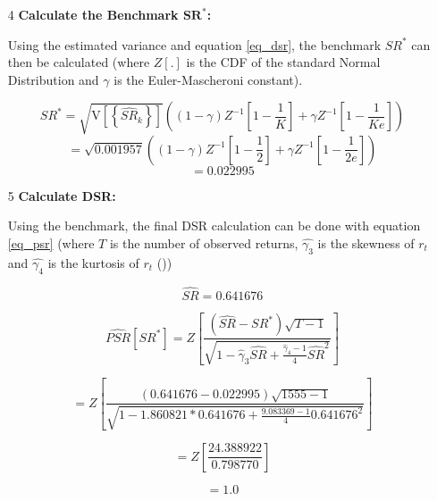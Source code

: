 \documentclass[a4paper,11pt,oneside]{article}
\theoremstyle{plain}
\theoremstyle{definition}
\begin{document}
\begin{itemize}
		\item [4] \textbf{Calculate the Benchmark $\mathbf{SR^*}$:} \newline
		
		Using the estimated variance and equation \eqref{eq_dsr}, the benchmark $SR^*$ can then be calculated (where $Z[.]$ is the CDF of the standard Normal Distribution 
		and $\gamma$ is the Euler-Mascheroni constant).
		
		\begin{equation}
		S R^{*}=\sqrt{\mathrm{V}\left[\left\{\widehat{S R}_{k}\right\}\right]}\left((1-\gamma) Z^{-1}\left[1-\frac{1}{K}\right]+\gamma Z^{-1}\left[1-\frac{1}{K e}\right]\right)
		\end{equation}
		\begin{equation}
		=\sqrt{{0.001957}}\left((1-\gamma) Z^{-1}\left[1-\frac{1}{2}\right]+\gamma Z^{-1}\left[1-\frac{1}{2 e}\right]\right)
		\end{equation}
		\begin{equation}
		=0.022995
		\end{equation}
		
		\item [5] \textbf{Calculate DSR:} \newline
		
		Using the benchmark, the final DSR calculation can be done with equation \eqref{eq_psr} (where $T$ is the number of observed returns, $\hat{\gamma_3}$ is the skewness of $r_t$ and $\hat{\gamma_4}$ is the kurtosis of $r_t$	())
		
		\begin{equation}
		\widehat{SR}=0.641676
		\end{equation}
		
		\begin{equation}
		\widehat{P S R}\left[S R^{*}\right]=Z\left[\frac{\left(\widehat{S R}-S R^{*}\right) \sqrt{T-1}}{\sqrt{1-\hat{\gamma}_{3} \widehat{S R}+\frac{\hat{\gamma}_{4}-1}{4} \widehat{S R}^{2}}}\right]
		\end{equation}
		
		\begin{equation}
		=Z\left[\frac{\left({0.641676}-{0.022995}\right) \sqrt{1555-1}}{\sqrt{1-{1.860821}\ast{0.641676}+\frac{{9.083369}-1}{4}{0.641676}^{2}}}\right]
		\end{equation}
		
		\begin{equation}
		=Z\left[\frac{24.388922}{0.798770}\right]
		\end{equation}
		
		\begin{equation}
		= {1.0}
		\end{equation}
		
		
	\end{itemize}
	
\end{document}
